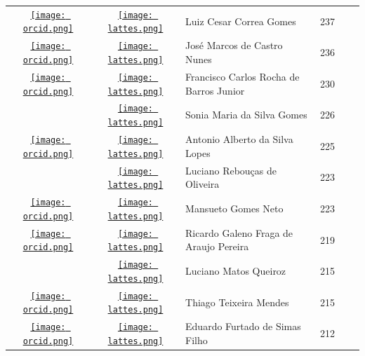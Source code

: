 \documentclass[12pt,brazil]{article}\usepackage[]{graphicx}\usepackage[]{xcolor}
\begin{document}
\begin{longtable}{cclrll}
\href{https://orcid.org/0000-0002-3171-9988}{\texttt{[image: orcid.png]}} & \href{http://lattes.cnpq.br/9902635897527204}{\texttt{[image: lattes.png]}} & Luiz Cesar Correa Gomes & 237 &  &  \\

\href{https://orcid.org/0000-0001-7142-5995}{\texttt{[image: orcid.png]}} & \href{http://lattes.cnpq.br/5553350296562020}{\texttt{[image: lattes.png]}} & José Marcos de Castro Nunes & 236 &  &  \\

\href{https://orcid.org/0000-0002-3037-1991}{\texttt{[image: orcid.png]}} & \href{http://lattes.cnpq.br/1085274416109765}{\texttt{[image: lattes.png]}} & Francisco Carlos Rocha de Barros Junior & 230 &  &  \\

 & \href{http://lattes.cnpq.br/3105186524832213}{\texttt{[image: lattes.png]}} & Sonia Maria da Silva Gomes & 226 &  &  \\

\href{https://orcid.org/0000-0002-7875-8212}{\texttt{[image: orcid.png]}} & \href{http://lattes.cnpq.br/4683004949201653}{\texttt{[image: lattes.png]}} & Antonio Alberto da Silva Lopes & 225 &  &  \\

 & \href{http://lattes.cnpq.br/0372650483087124}{\texttt{[image: lattes.png]}} & Luciano Rebouças de Oliveira & 223 &  &  \\

\href{https://orcid.org/0000-0002-0717-9694}{\texttt{[image: orcid.png]}} & \href{http://lattes.cnpq.br/1725940502832756}{\texttt{[image: lattes.png]}} & Mansueto Gomes Neto & 223 &  &  \\

\href{https://orcid.org/0000-0003-3913-3735}{\texttt{[image: orcid.png]}} & \href{http://lattes.cnpq.br/1786940828895467}{\texttt{[image: lattes.png]}} & Ricardo Galeno Fraga de Araujo Pereira & 219 &  &  \\

 & \href{http://lattes.cnpq.br/3016420113023123}{\texttt{[image: lattes.png]}} & Luciano Matos Queiroz & 215 &  &  \\

\href{https://orcid.org/0000-0003-1644-4020}{\texttt{[image: orcid.png]}} & \href{http://lattes.cnpq.br/1989081286274816}{\texttt{[image: lattes.png]}} & Thiago Teixeira Mendes & 215 &  &  \\

\href{https://orcid.org/0000-0001-8707-785X}{\texttt{[image: orcid.png]}} & \href{http://lattes.cnpq.br/6012321412801915}{\texttt{[image: lattes.png]}} & Eduardo Furtado de Simas Filho & 212 &  &  \\


\end{longtable}
\end{document}

